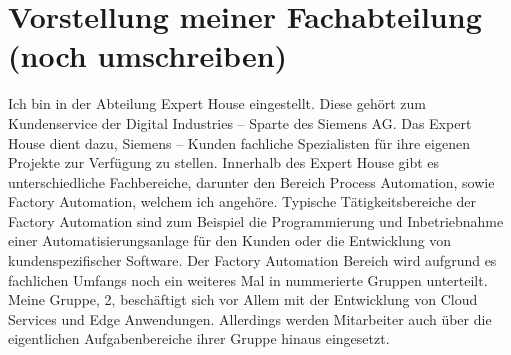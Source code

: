 \chapter{Vorstellung meiner Fachabteilung (noch umschreiben)}\label{ch:data}

\label{sec:Vorstellung meiner Fachabteilung (noch umschreiben)}

Ich bin in der Abteilung Expert House eingestellt. Diese gehört zum Kundenservice
der Digital Industries – Sparte des Siemens AG. Das Expert House dient dazu,
Siemens – Kunden fachliche Spezialisten für ihre eigenen Projekte zur Verfügung
zu stellen. Innerhalb des Expert House gibt es unterschiedliche Fachbereiche, darunter den Bereich Process Automation, sowie Factory Automation, welchem ich angehöre. Typische Tätigkeitsbereiche der Factory Automation sind zum Beispiel die
Programmierung und Inbetriebnahme einer Automatisierungsanlage für den
Kunden oder die Entwicklung von kundenspezifischer Software. Der Factory
Automation Bereich wird aufgrund es fachlichen Umfangs noch ein weiteres Mal in
nummerierte Gruppen unterteilt. Meine Gruppe, 2, beschäftigt sich vor Allem mit
der Entwicklung von Cloud Services und Edge Anwendungen. Allerdings werden
Mitarbeiter auch über die eigentlichen Aufgabenbereiche ihrer Gruppe hinaus
eingesetzt.

